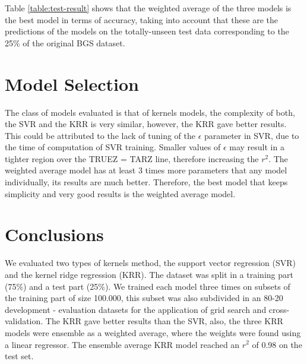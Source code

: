 Table \ref{table:test-result} shows that the weighted average of the three models is the best model in terms of accuracy, taking into account that these are the predictions of the models on the totally-unseen test data corresponding to the 25\% of the original BGS dataset. 
\section{Model Selection}

The class of models evaluated is that of kernels models, the complexity of both, the SVR and the KRR is very similar, however, the KRR gave better results. This could be attributed to the lack of tuning of the $\epsilon$ parameter in SVR, due to the time of computation of SVR training. Smaller values of $\epsilon$ may result in a tighter region over the TRUEZ = TARZ line, therefore increasing the $r^2$. The weighted average model has at least 3 times more parameters that any model individually, its results are much better. Therefore, the best model that keeps simplicity and very good results is the weighted average model. 

\section{Conclusions}

We evaluated two types of kernels method, the support vector regression (SVR) and the kernel ridge regression (KRR). The dataset was split in a training part (75\%) and a test part (25\%). We trained each model three times on subsets of the training part of size 100.000, this subset was also subdivided in an 80-20 development - evaluation datasets for the application of grid search and cross-validation. The KRR gave better results than the SVR, also, the three KRR models were ensemble as a weighted average, where the weights were found using a linear regressor. The ensemble average KRR model reached an $r^2$ of 0.98 on the test set. 